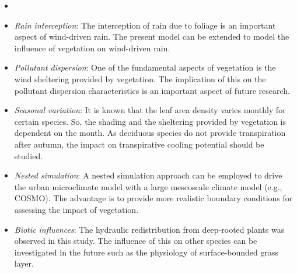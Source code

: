 \begin{itemize}
	\item {}
	
	\item \textit{Rain interception}: The interception of rain due to foliage is an important aspect of wind-driven rain. The present model can be extended to model the influence of vegetation on wind-driven rain.

	\item \textit{Pollutant dispersion}: One of the fundamental aspects of vegetation is the wind sheltering provided by vegetation. The implication of this on the pollutant dispersion characteristics is an important aspect of future research. 
	
	\item \textit{Seasonal variation}: It is known that the leaf area density varies monthly for certain species. So, the shading and the sheltering provided by vegetation is dependent on the month. As deciduous species do not provide transpiration after autumn, the impact on transpirative cooling potential should be studied.
	
	\item \textit{Nested simulation}: A nested simulation approach can be employed to drive the urban microclimate model with a large mescoscale climate model (e.g., COSMO). The advantage is to provide more realistic boundary conditions for assessing the impact of vegetation.

	
	\item \textit{Biotic influences}: The hydraulic redistribution from deep-rooted plants was observed in this study. The influence of this on other species can be investigated in the future such as the physiology of surface-bounded grass layer.


\end{itemize}
